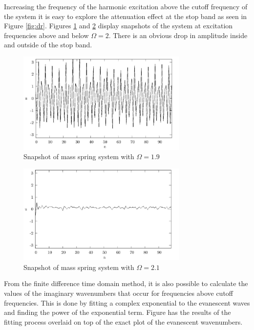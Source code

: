 \documentclass{article}
\begin{document}
Increasing the frequency of the harmonic excitation above the cutoff frequency 
of the system it is easy to explore the attenuation effect at the stop band as 
seen in Figure \ref{fig:dr}. Figures \ref{fig:snap19} and \ref{fig:snap21} 
display snapshots of the system at excitation frequencies above and below 
$\Omega=2$. There is an obvious drop in amplitude inside and outside of the 
stop band.
\begin{figure}[!htbp]
	\centering
	\includegraphics[width=0.75\textwidth]{snap-f19.pdf}
	\caption{Snapshot of mass spring system with $\Omega=1.9$}
	\label{fig:snap19}
\end{figure}
\begin{figure}[!htbp]
	\centering
	\includegraphics[width=0.75\textwidth]{snap-f21.pdf}
	\caption{Snapshot of mass spring system with $\Omega=2.1$}
	\label{fig:snap21}
\end{figure}

From the finite difference time domain method, it is also possible to calculate 
the values of the imaginary wavenumbers that occur for frequencies above cutoff 
frequencies. This is done by fitting a complex exponential to the evanescent 
waves and finding the power of the exponential term. Figure  has the results of 
the fitting process overlaid on top of the exact plot of the evanescent 
wavenumbers. 
\end{document}
